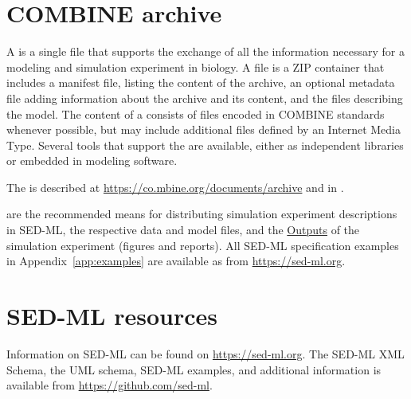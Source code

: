 \section{COMBINE archive}
\label{sec:archive}

A  \citep{Bergmann2014} is a single file that supports the exchange of all the information necessary for a modeling and simulation experiment in biology. A  file is a ZIP container that includes a manifest file, listing the content of the archive, an optional metadata file adding information about the archive and its content, and the files describing the model. The content of a  consists of files encoded in COMBINE standards whenever possible, but may include additional files defined by an Internet Media Type. Several tools that support the  are available, either as independent libraries or embedded in modeling software.

The  is described at \url{https://co.mbine.org/documents/archive} and 
in \citep{Bergmann2014}.

 are the recommended means for distributing simulation experiment descriptions in SED-ML, the respective data and model files, and the \hyperref[class:output]{Outputs} of the simulation experiment (figures and reports). All SED-ML specification examples in Appendix~\ref{app:examples} are available as  from \url{https://sed-ml.org}.

\section{SED-ML resources}
\label{sec:resources}

Information on SED-ML can be found on \url{https://sed-ml.org}. The SED-ML XML Schema, the UML schema, SED-ML examples, and additional information is available from \url{https://github.com/sed-ml}.
